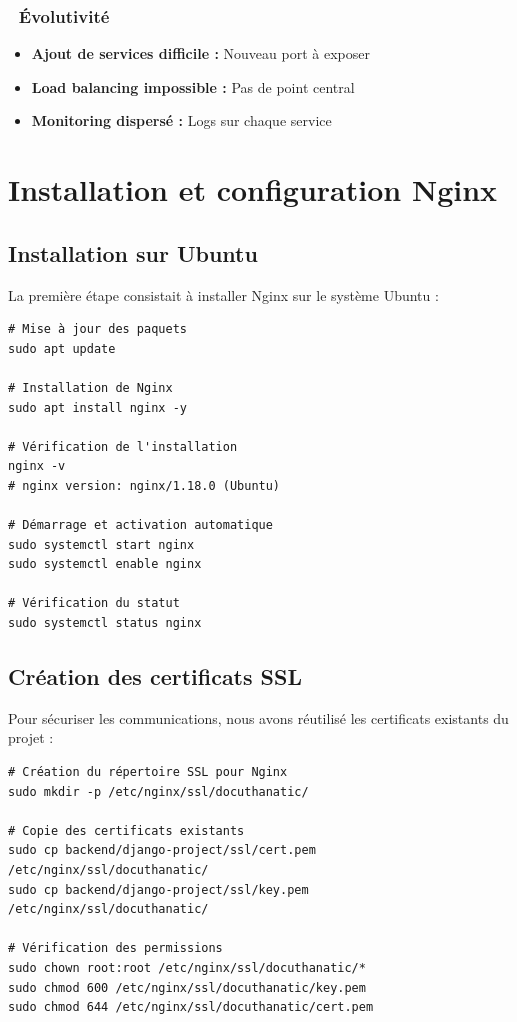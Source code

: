 \documentclass[12pt,a4paper]{article}
\begin{document}
\subsubsection{🔴 Évolutivité}
\begin{itemize}[leftmargin=*]
    \item \textbf{Ajout de services difficile :} Nouveau port à exposer
    \item \textbf{Load balancing impossible :} Pas de point central
    \item \textbf{Monitoring dispersé :} Logs sur chaque service
\end{itemize}


\section{Installation et configuration Nginx}

\subsection{Installation sur Ubuntu}

La première étape consistait à installer Nginx sur le système Ubuntu :

\begin{lstlisting}[style=bash, caption={Installation de Nginx sur Ubuntu}]
# Mise à jour des paquets
sudo apt update

# Installation de Nginx
sudo apt install nginx -y

# Vérification de l'installation
nginx -v
# nginx version: nginx/1.18.0 (Ubuntu)

# Démarrage et activation automatique
sudo systemctl start nginx
sudo systemctl enable nginx

# Vérification du statut
sudo systemctl status nginx
\end{lstlisting}

\subsection{Création des certificats SSL}

Pour sécuriser les communications, nous avons réutilisé les certificats existants du projet :

\begin{lstlisting}[style=bash, caption={Configuration des certificats SSL}]
# Création du répertoire SSL pour Nginx
sudo mkdir -p /etc/nginx/ssl/docuthanatic/

# Copie des certificats existants
sudo cp backend/django-project/ssl/cert.pem /etc/nginx/ssl/docuthanatic/
sudo cp backend/django-project/ssl/key.pem /etc/nginx/ssl/docuthanatic/

# Vérification des permissions
sudo chown root:root /etc/nginx/ssl/docuthanatic/*
sudo chmod 600 /etc/nginx/ssl/docuthanatic/key.pem
sudo chmod 644 /etc/nginx/ssl/docuthanatic/cert.pem
\end{lstlisting}
\end{document}
